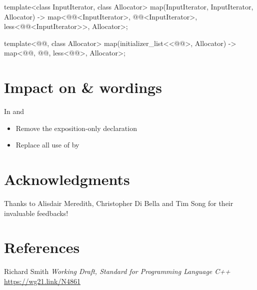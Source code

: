 \documentclass{wg21}
\begin{document}
\begin{codeblock}
{    template<class InputIterator, class Allocator>
    map(InputIterator, InputIterator, Allocator)
    -> map<@@<InputIterator>, @@<InputIterator>,
    less<@@<InputIterator>>, Allocator>;

    template<@@, class Allocator>
    map(initializer_list<<@@>, Allocator)
    -> map<@@, @@, less<@@>, Allocator>;
}
\end{codeblock}




\section{Impact on  \&  wordings}

In  and 


\begin{itemize}
\item Remove the exposition-only  declaration
\item Replace all use of  by 
\end{itemize}

\section{Acknowledgments}

Thanks to Alisdair Meredith, Christopher Di Bella and Tim Song for their invaluable feedbacks!

\section{References}
\renewcommand{\section}[2]{}%



\begin{thebibliography}{9}

    Richard Smith
    \emph{Working Draft, Standard for Programming Language C++}\newline
    \url{https://wg21.link/N4861}

\end{thebibliography}
\end{document}

